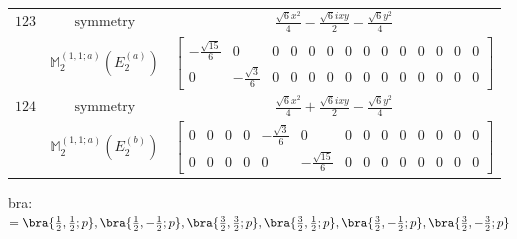 \documentclass[fleqn,8pt,landscape]{jsarticle}
\begin{document}
\begin{longtable}{ccc}
$ 123 $ & $ \text{symmetry} $ & $ \frac{\sqrt{6} x^{2}}{4} - \frac{\sqrt{6} i x y}{2} - \frac{\sqrt{6} y^{2}}{4} $ \\
$  $ & $ \mathbb{M}_{2}^{(1,1;a)}(E_{2}^{(a)}) $ & $ \begin{bmatrix} - \frac{\sqrt{15}}{6} & 0 & 0 & 0 & 0 & 0 & 0 & 0 & 0 & 0 & 0 & 0 & 0 & 0 \\ 0 & - \frac{\sqrt{3}}{6} & 0 & 0 & 0 & 0 & 0 & 0 & 0 & 0 & 0 & 0 & 0 & 0 \end{bmatrix} $ \\ \hline
$ 124 $ & $ \text{symmetry} $ & $ \frac{\sqrt{6} x^{2}}{4} + \frac{\sqrt{6} i x y}{2} - \frac{\sqrt{6} y^{2}}{4} $ \\
$  $ & $ \mathbb{M}_{2}^{(1,1;a)}(E_{2}^{(b)}) $ & $ \begin{bmatrix} 0 & 0 & 0 & 0 & - \frac{\sqrt{3}}{6} & 0 & 0 & 0 & 0 & 0 & 0 & 0 & 0 & 0 \\ 0 & 0 & 0 & 0 & 0 & - \frac{\sqrt{15}}{6} & 0 & 0 & 0 & 0 & 0 & 0 & 0 & 0 \end{bmatrix} $ \\ \hline
\end{longtable}
bra: $=\bra{\frac{1}{2},\frac{1}{2};p}, \bra{\frac{1}{2},- \frac{1}{2};p}, \bra{\frac{3}{2},\frac{3}{2};p}, \bra{\frac{3}{2},\frac{1}{2};p}, \bra{\frac{3}{2},- \frac{1}{2};p}, \bra{\frac{3}{2},- \frac{3}{2};p}$
\end{document}
